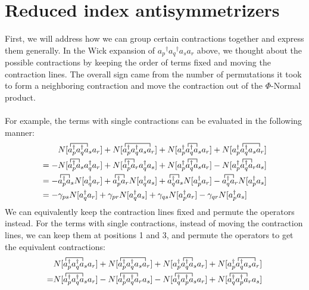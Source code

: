 \documentclass{article}
\newcommand{\fctr}{\contraction}
\newcommand{\dg}{\ensuremath{^\dagger} }
\begin{document}
\section{Reduced index antisymmetrizers}
First, we will address how we can group certain contractions together and express them generally. 
In the Wick expansion of $a_p\dg a_q\dg a_s a_r $ above, we thought about the possible contractions by keeping the order of terms fixed and moving the contraction lines.
The overall sign came from the number of permutations it took to form a neighboring contraction and move the contraction out of the $\Phi$-Normal product.  \\ \\
For example, the terms with single contractions can be evaluated in the following manner: 
\begin{align*}
&N[ \fctr{}{x}{{}_1a_q\dg }{x} a_p\dg a_q\dg a_s a_r  ] + N[ \fctr{}{x}{{}_1a_q\dg  a_s }{x} a_p\dg a_q\dg a_s a_r  ] 
+ N[ \fctr{a_p\dg }{x}{{}_2}{x} a_p\dg a_q\dg a_s a_r  ] +  N[ \fctr{a_p\dg }{x}{{}_2 a_s }{x} a_p\dg a_q\dg a_s a_r  ] \\ 
= - & N[ \fctr{}{x}{{}_1 }{x} a_p\dg  a_s a_q\dg a_r  ] + N[ \fctr{}{x}{{}_1 }{x} a_p\dg a_r a_q\dg a_s   ] 
+ N[ \fctr{a_p\dg }{x}{{}_2}{x} a_p\dg a_q\dg a_s a_r  ] - N[ \fctr{a_p\dg }{x}{{}_2 }{x} a_p\dg a_q\dg  a_r  a_s ] \\
= - & \fctr{}{x}{{}_1 }{x} a_p\dg  a_s N[  a_q\dg a_r  ] + \fctr{}{x}{{}_1 }{x} a_p\dg a_r N[  a_q\dg a_s   ] 
+ \fctr{ }{x}{{}_2}{x} a_q\dg a_s N[  a_p\dg  a_r  ] -\fctr{ }{x}{{}_2 }{x}a_q\dg  a_r N[  a_p\dg   a_s ] \\
=  - & \gamma_{ps} N[  a_q\dg a_r  ] + \gamma_{pr} N[  a_q\dg a_s   ] 
+ \gamma_{qs}  N[  a_p\dg  a_r  ] -\gamma_{qr}  N[  a_p\dg   a_s ] \\
\end{align*}
We can equivalently keep the contraction lines fixed and permute the operators instead. 
For the terms with single contractions, instead of moving the contraction lines, we can keep them at positions 1 and 3, and permute the operators to get the equivalent contractions: 
\begin{align*}
&N[ \fctr{}{x}{{}_1a_q\dg }{x} a_p\dg a_q\dg a_s a_r  ] + N[ \fctr{}{x}{{}_1a_q\dg  a_s }{x} a_p\dg a_q\dg a_s a_r  ] 
+ N[ \fctr{a_p\dg }{x}{{}_2}{x} a_p\dg a_q\dg a_s a_r  ] +  N[ \fctr{a_p\dg }{x}{{}_2 a_s }{x} a_p\dg a_q\dg a_s a_r  ] \\ 
= & N[ \fctr{}{x}{{}_1a_q\dg }{x} a_p\dg a_q\dg a_s a_r  ] - N[ \fctr{}{x}{{}_1a_q\dg  }{x} a_p\dg a_q\dg a_r  a_s  ] 
- N[ \fctr{ }{x}{{}_q\dg a_p\dg }{x} a_q\dg  a_p\dg a_s a_r  ] +  N[ \fctr{ }{x}{{}_q\dg a_p\dg }{x} a_q\dg a_p\dg  a_r a_s   ] \\ 
\end{align*}
\end{document}

